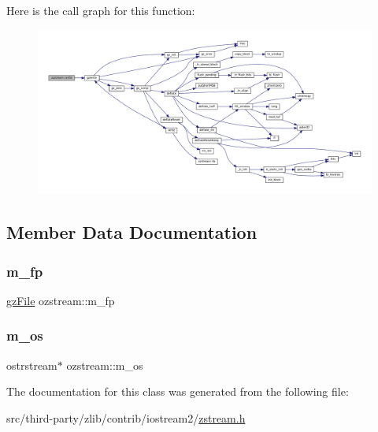 Here is the call graph for this function\+:
\nopagebreak
\begin{figure}[H]
\begin{center}
\leavevmode
\includegraphics[width=350pt]{classozstream_a2dbcc101aa6e94eb2ca866e9b8db4c84_cgraph}
\end{center}
\end{figure}


\subsection{Member Data Documentation}
\mbox{\label{classozstream_a1c35d36aec66a89464ce99316342999f}} 
\subsubsection{\texorpdfstring{m\+\_\+fp}{m\_fp}}
{\footnotesize\ttfamily \mbox{\hyperlink{zlib_8h_a8e80bd9e2c359bc5bdabb2e97b4e62bf}{gz\+File}} ozstream\+::m\+\_\+fp\hspace{0.3cm}{\ttfamily [private]}}

\mbox{\label{classozstream_a60d763f7f0d932e732c5c58d22213a53}} 
\subsubsection{\texorpdfstring{m\+\_\+os}{m\_os}}
{\footnotesize\ttfamily ostrstream$\ast$ ozstream\+::m\+\_\+os\hspace{0.3cm}{\ttfamily [private]}}



The documentation for this class was generated from the following file\+:\begin{DoxyCompactItemize}
\item 
src/third-\/party/zlib/contrib/iostream2/\mbox{\hyperlink{zstream_8h}{zstream.\+h}}\end{DoxyCompactItemize}
